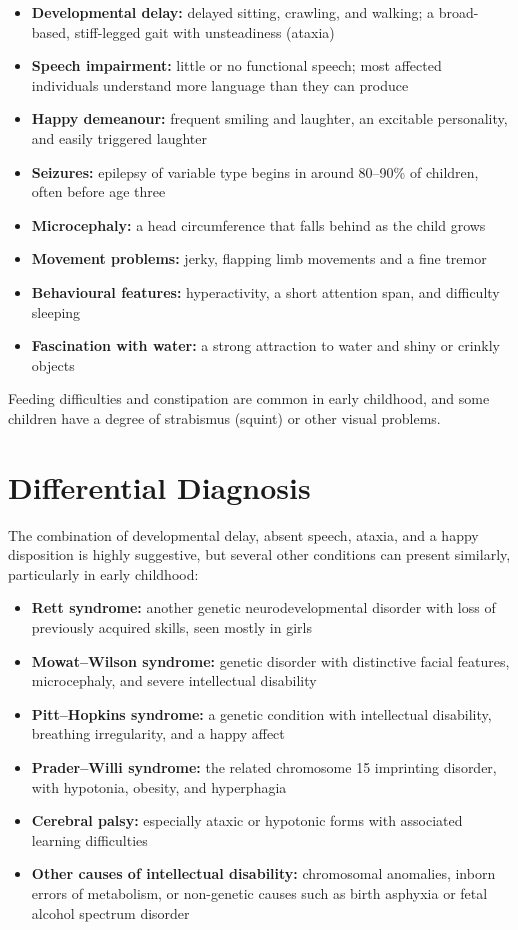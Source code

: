 \begin{itemize}
    \item \textbf{Developmental delay:} delayed sitting, crawling, and walking; a broad-based, stiff-legged gait with unsteadiness (ataxia)
    \item \textbf{Speech impairment:} little or no functional speech; most affected individuals understand more language than they can produce
    \item \textbf{Happy demeanour:} frequent smiling and laughter, an excitable personality, and easily triggered laughter
    \item \textbf{Seizures:} epilepsy of variable type begins in around 80--90\% of children, often before age three
    \item \textbf{Microcephaly:} a head circumference that falls behind as the child grows
    \item \textbf{Movement problems:} jerky, flapping limb movements and a fine tremor
    \item \textbf{Behavioural features:} hyperactivity, a short attention span, and difficulty sleeping
    \item \textbf{Fascination with water:} a strong attraction to water and shiny or crinkly objects
\end{itemize}

Feeding difficulties and constipation are common in early childhood, and some children have a degree of strabismus (squint) or other visual problems.

\section*{Differential Diagnosis}
The combination of developmental delay, absent speech, ataxia, and a happy disposition is highly suggestive, but several other conditions can present similarly, particularly in early childhood:

\begin{itemize}
    \item \textbf{Rett syndrome:} another genetic neurodevelopmental disorder with loss of previously acquired skills, seen mostly in girls
    \item \textbf{Mowat--Wilson syndrome:} genetic disorder with distinctive facial features, microcephaly, and severe intellectual disability
    \item \textbf{Pitt--Hopkins syndrome:} a genetic condition with intellectual disability, breathing irregularity, and a happy affect
    \item \textbf{Prader--Willi syndrome:} the related chromosome 15 imprinting disorder, with hypotonia, obesity, and hyperphagia
    \item \textbf{Cerebral palsy:} especially ataxic or hypotonic forms with associated learning difficulties
    \item \textbf{Other causes of intellectual disability:} chromosomal anomalies, inborn errors of metabolism, or non-genetic causes such as birth asphyxia or fetal alcohol spectrum disorder
\end{itemize}

